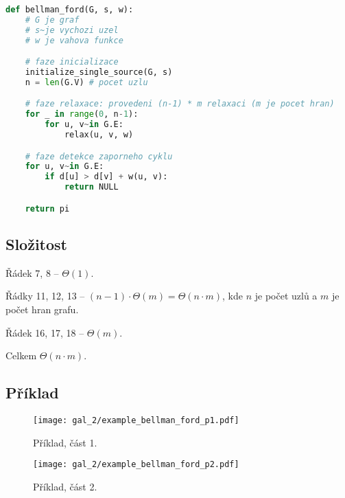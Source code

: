 \bigskip\noindent\begin{minipage}{\linewidth}
\begin{lstlisting}[language=Python, caption={Algoritmus Bellman-Ford. Proč $n-1$ iterací? Protože mezi libovolnými dvěma uzly v~grafu, existuje cesta o~maximálním počtu hran $n-1$.}]
def bellman_ford(G, s, w):
    # G je graf
    # s~je vychozi uzel
    # w je vahova funkce

    # faze inicializace
    initialize_single_source(G, s)
    n = len(G.V) # pocet uzlu

    # faze relaxace: provedeni (n-1) * m relaxaci (m je pocet hran)
    for _ in range(0, n-1):
        for u, v~in G.E:
            relax(u, v, w)

    # faze detekce zaporneho cyklu
    for u, v~in G.E:
        if d[u] > d[v] + w(u, v):
            return NULL

    return pi
\end{lstlisting}
\end{minipage}

\subsection*{Složitost}

\begin{compactitem}
    \item Řádek 7, 8 -- $\Theta(1)$.
    \item Řádky 11, 12, 13 -- $(n-1) \cdot \Theta(m) = \Theta(n \cdot m)$, kde $n$ je počet uzlů a $m$ je počet hran grafu.
    \item Řádek 16, 17, 18 -- $\Theta(m)$.
    \item Celkem $\Theta(n \cdot m)$.
\end{compactitem}

\subsection*{Příklad}

\begin{figure}[H]
    \centering
    \texttt{[image: gal\_2/example\_bellman\_ford\_p1.pdf]}
    \caption{Příklad, část 1.}
\end{figure}

\begin{figure}[H]
    \centering
    \texttt{[image: gal\_2/example\_bellman\_ford\_p2.pdf]}
    \caption{Příklad, část 2.}
\end{figure}

